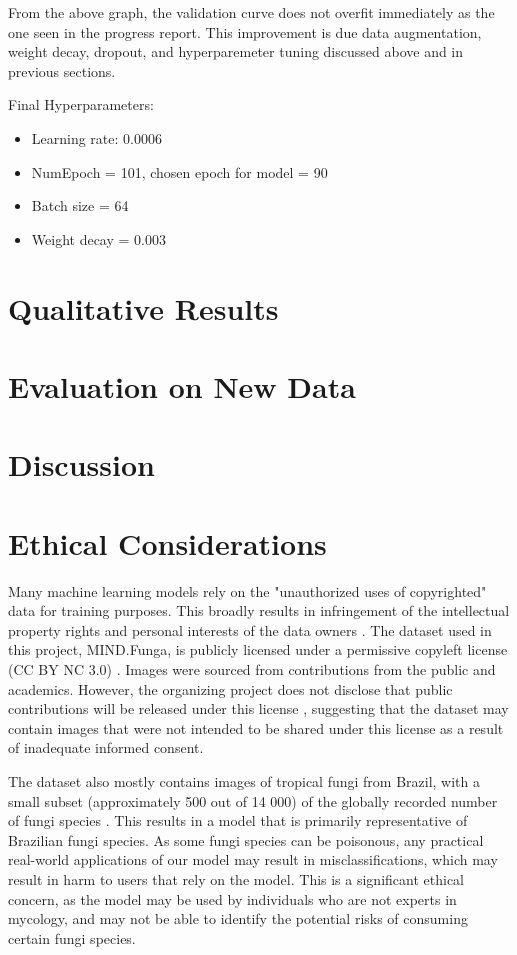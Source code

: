 \documentclass{article} %
\begin{document}
From the above graph, the validation curve does not overfit immediately as the one seen in the progress report. This improvement is due data augmentation, weight decay, dropout, and hyperparemeter tuning discussed above and in previous sections. 

Final Hyperparameters:
\begin{itemize}
    \item Learning rate: 0.0006
    \item NumEpoch = 101, chosen epoch for model = 90
    \item Batch size = 64
    \item Weight decay = 0.003
\end{itemize}

\section{Qualitative Results}
\label{sec:qualitative_results}

\section{Evaluation on New Data}
\label{sec:evaluation}

\section{Discussion}
\label{sec:discussion}

\section{Ethical Considerations}
\label{sec:ethics}
Many machine learning models rely on the "unauthorized uses of copyrighted" data for training purposes. This broadly results in infringement of the intellectual property rights and personal interests of the data owners \citep{Sobel.TaxonomyTrainingData.2021}. The dataset used in this project, MIND.Funga, is publicly licensed under a permissive copyleft license (CC BY NC 3.0) \citep{Drechsler-SantosKarstedtEtAl.MINDFunga.2023}. Images were sourced from contributions from the public and academics. However, the organizing project does not disclose that public contributions will be released under this license \citep{Drechsler-SantosKarstedtEtAl.MINDFunga.2023}, suggesting that the dataset may contain images that were not intended to be shared under this license as a result of inadequate informed consent.

The dataset also mostly contains images of tropical fungi from Brazil, with a small subset (approximately 500 out of 14 000) of the globally recorded number of fungi species \citep{LuckingAimeEtAl.UnambiguousIdentificationFungi.2020}. This results in a model that is primarily representative of Brazilian fungi species. As some fungi species can be poisonous, any practical real-world applications of our model may result in misclassifications, which may result in harm to users that rely on the model. This is a significant ethical concern, as the model may be used by individuals who are not experts in mycology, and may not be able to identify the potential risks of consuming certain fungi species.

\label{last_page}



\end{document}

